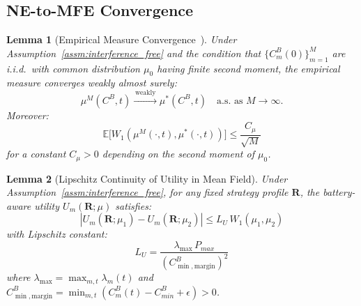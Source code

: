 \documentclass[journal]{IEEEtran}
\newtheorem{lemma}{Lemma}
\newcommand{\CB}{C^{B}}
\newcommand{\CBmin}{C^{B}_{min}}
\newcommand{\Pmax}{P_{max}}
\newcommand{\bfR}{\mathbf{R}}
\newcommand{\WassDist}{W_{1}}
\begin{document}
\subsection{NE-to-MFE Convergence}

\begin{lemma}[Empirical Measure Convergence~\cite{fournier2015wasserstein}]
\label{lem:emp_conv}
Under Assumption~\ref{assm:interference_free} and the condition that $\{\CB_m(0)\}_{m=1}^M$ are i.i.d.\ with common distribution $\mu_0$ having finite second moment, the empirical measure converges weakly almost surely:
\begin{equation}
    \mu^M(\CB,t)
    \xrightarrow{\,\mathrm{weakly}\,}
    \mu^*(\CB,t)
    \quad\text{a.s.\ as }M\to\infty.
\end{equation}
Moreover:
\begin{equation}
    \mathbb{E}\bigl[
    \WassDist(\mu^M(\cdot,t),\mu^*(\cdot,t))
    \bigr]
    \leq \frac{C_\mu}{\sqrt{M}}
    \label{eq:emp_rate}
\end{equation}
for a constant $C_\mu>0$ depending on the second moment of $\mu_0$.
\end{lemma}


\begin{lemma}[Lipschitz Continuity of Utility
in Mean Field]
\label{lem:lipschitz}
Under Assumption~\ref{assm:interference_free}, for any fixed strategy profile $\bfR$, the battery-aware utility $U_m(\bfR;\mu)$ satisfies:
\begin{equation}
    |U_m(\bfR;\mu_1) - U_m(\bfR;\mu_2)|
    \leq L_U\,\WassDist(\mu_1,\mu_2)
    \label{eq:lipschitz_cond}
\end{equation}
with Lipschitz constant:
\begin{equation}
    L_U = \frac{\lambda_{\max}\,\Pmax}
    {(C^B_{\min,\mathrm{margin}})^2}
    \label{eq:lipschitz_const}
\end{equation}
where $\lambda_{\max} = \max_{m,t}\lambda_m(t)$ and $C^B_{\min,\mathrm{margin}} = \min_{m,t}(\CB_m(t) - \CBmin + \epsilon) > 0$.
\end{lemma}
\end{document}
